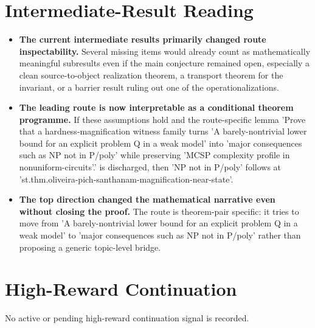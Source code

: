 \documentclass[11pt]{article}
\begin{document}
\section{Intermediate-Result Reading}
\begin{itemize}[leftmargin=1.5em]
\item \textbf{The current intermediate results primarily changed route inspectability.} Several missing items would already count as mathematically meaningful subresults even if the main conjecture remained open, especially a clean source-to-object realization theorem, a transport theorem for the invariant, or a barrier result ruling out one of the operationalizations.
\item \textbf{The leading route is now interpretable as a conditional theorem programme.} If these assumptions hold and the route-specific lemma 'Prove that a hardness-magnification witness family turns 'A barely-nontrivial lower bound for an explicit problem Q in a weak model' into 'major consequences such as NP not in P/poly' while preserving 'MCSP complexity profile in nonuniform-circuits'.' is discharged, then 'NP not in P/poly' follows at 'st.thm.oliveira-pich-santhanam-magnification-near-state'.
\item \textbf{The top direction changed the mathematical narrative even without closing the proof.} The route is theorem-pair specific: it tries to move from 'A barely-nontrivial lower bound for an explicit problem Q in a weak model' to 'major consequences such as NP not in P/poly' rather than proposing a generic topic-level bridge.
\end{itemize}

\section{High-Reward Continuation}
No active or pending high-reward continuation signal is recorded.
\end{document}
